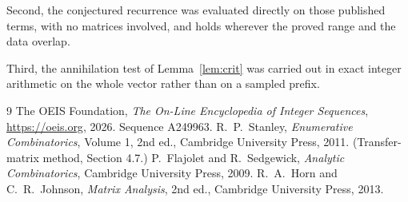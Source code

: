\documentclass[11pt,a4paper]{article}
\theoremstyle{plain}
\theoremstyle{definition}
\begin{document}
Second, the conjectured recurrence was evaluated directly on those published terms, with no
matrices involved, and holds wherever the proved range and the data overlap.

Third, the annihilation test of Lemma~\ref{lem:crit} was carried out in exact integer
arithmetic on the whole vector rather than on a sampled prefix.

\begin{thebibliography}{9}
 The OEIS Foundation, \emph{The On-Line Encyclopedia of Integer
Sequences}, \url{https://oeis.org}, 2026. Sequence A249963.
 R.~P.~Stanley, \emph{Enumerative Combinatorics}, Volume 1, 2nd ed.,
Cambridge University Press, 2011. (Transfer-matrix method, Section 4.7.)
 P.~Flajolet and R.~Sedgewick, \emph{Analytic Combinatorics}, Cambridge
University Press, 2009.
 R.~A.~Horn and C.~R.~Johnson, \emph{Matrix Analysis}, 2nd ed., Cambridge
University Press, 2013.
\end{thebibliography}
\end{document}
